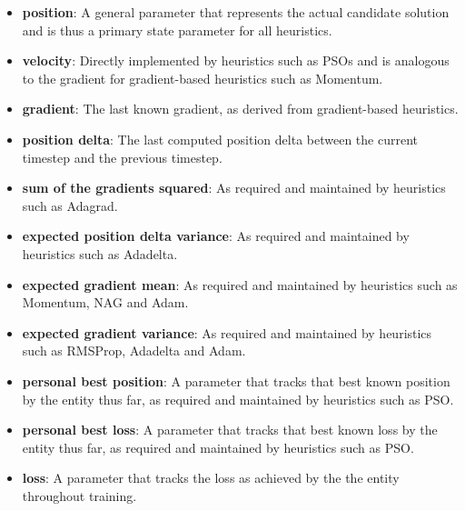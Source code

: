 \begin{itemize}
      \item \textbf{position}: A general parameter that represents the actual candidate solution and is thus a primary state parameter for all heuristics.

      \item \textbf{velocity}: Directly implemented by heuristics such as \acp{PSO} and is analogous to the gradient for gradient-based heuristics such as \ac{Momentum}.

      \item \textbf{gradient}: The last known gradient, as derived from gradient-based heuristics.

      \item \textbf{position delta}: The last computed position delta between the current timestep and the previous timestep.

      \item \textbf{sum of the gradients squared}: As required and maintained by heuristics such as \acs{Adagrad}.

      \item \textbf{expected position delta variance}: As required and maintained by heuristics such as \acs{Adadelta}.

      \item \textbf{expected gradient mean}: As required and maintained by heuristics such as \acs{Momentum}, \acs{NAG} and \acs{Adam}.

      \item \textbf{expected gradient variance}: As required and maintained by heuristics such as \acs{RMSProp}, \acs{Adadelta} and \acs{Adam}.

      \item \textbf{personal best position}: A parameter that tracks that best known position by the entity thus far, as required and maintained by heuristics such as \acs{PSO}.

      \item \textbf{personal best loss}: A parameter that tracks that best known loss by the entity thus far, as required and maintained by heuristics such as \acs{PSO}.

      \item \textbf{loss}: A parameter that tracks the loss as achieved by the the entity throughout training.
\end{itemize}

